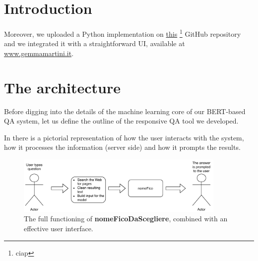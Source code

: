 \documentclass[12pt,a4paper,hidelinks]{article}
\newcommand{\nomefico}{\textbf{nomeFicoDaScegliere}}
\begin{document}

\newpage
\setcounter{page}{1}

\section{Introduction}\label{sec:intro}

Moreover, we uploaded a Python implementation on \href{cia}{this} \footnote{ciap} GitHub repository and we integrated it with a straightforward UI, available at \href{www.gemmamartini.it}{www.gemmamartini.it}.



\section{The architecture}\label{sec:model}
Before digging into the details of the machine learning core of our BERT-based QA system, let us define the outline of the responsive QA tool we developed.

In  there is a pictorial representation of how the user interacts with the system, how it processes the information (server side) and how it prompts the results.

\begin{figure}[ht!]
    \centering
    \includegraphics[width=0.9\textwidth]{report/pics/tool_dataflow.pdf}
    \caption{The full functioning of \nomefico, combined with an effective user interface.}
    \label{fig:application_dataflow}
\end{figure}

\end{document}
